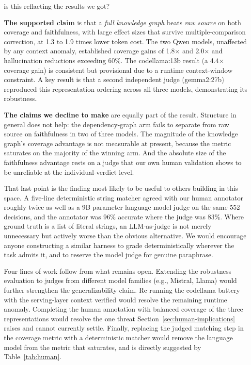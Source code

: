 is this reflacting the results we got?\documentclass[conference]{IEEEtran}
\begin{document}
\textbf{The supported claim} is that a \emph{full knowledge graph} beats \emph{raw source} on
both coverage and faithfulness, with large effect sizes that survive
multiple-comparison correction, at 1.3 to 1.9 times lower token cost. The two Qwen models, unaffected by any context anomaly, established coverage gains of 1.8$\times$ and 2.0$\times$ and hallucination reductions exceeding 60\%. The codellama:13b result (a 4.4$\times$ coverage gain) is consistent but provisional due to a runtime context-window constraint. A key result is that a second independent judge (gemma2:27b) reproduced this representation ordering across all three models, demonstrating its robustness.

\textbf{The claims we decline to make} are equally part of the result. Structure in general does
not help: the dependency-graph arm fails to separate from raw source on faithfulness in two of
three models. The magnitude of the knowledge graph's coverage advantage is not measurable at
present, because the metric saturates on the majority of the winning arm. And the absolute size
of the faithfulness advantage rests on a judge that our own human validation shows to be
unreliable at the individual-verdict level.

That last point is the finding most likely to be useful to others building in this space. A
five-line deterministic string matcher agreed with our human annotator roughly twice as well as
a 9B-parameter language-model judge on the same 552 decisions, and the annotator was 96\%
accurate where the judge was 83\%. Where ground truth is a list of literal strings, an
LLM-as-judge is not merely unnecessary but actively worse than the obvious alternative. We would
encourage anyone constructing a similar harness to grade deterministically wherever the task
admits it, and to reserve the model judge for genuine paraphrase.

Four lines of work follow from what remains open. Extending the robustness evaluation to judges from different model families (e.g., Mistral, Llama) would further strengthen the generalizability claim. Re-running the codellama battery with the serving-layer context verified would resolve the remaining runtime anomaly. Completing the human annotation with balanced coverage of the three representations would resolve the one threat Section~\ref{sec:human-implications} raises and cannot currently settle. Finally, replacing the judged matching step in the coverage metric with a deterministic matcher would remove the language model from the metric that saturates, and is directly suggested by Table~\ref{tab:human}.
\end{document}
